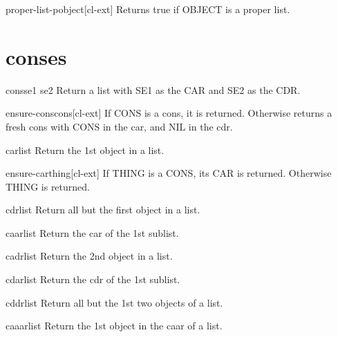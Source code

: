\documentclass[10pt,english]{book}
\begin{document}
\begin{function}{proper-list-p}{object}[cl-ext]
  Returns true if OBJECT is a proper list.
\end{function}

\section{conses}
\label{sec:conses}

\begin{function}{cons}{se1 se2}
  Return a list with SE1 as the CAR and SE2 as the CDR.
\end{function}

\begin{function}{ensure-cons}{cons}[cl-ext]
  If CONS is a cons, it is returned. Otherwise returns a fresh cons with CONS
  in the car, and NIL in the cdr.
\end{function}

\begin{accessor}{car}{list}
  Return the 1st object in a list.
\end{accessor}

\begin{function}{ensure-car}{thing}[cl-ext]
  If THING is a CONS, its CAR is returned. Otherwise THING is returned.
\end{function}

\begin{accessor}{cdr}{list}
  Return all but the first object in a list.
\end{accessor}

\begin{accessor}{caar}{list}
  Return the car of the 1st sublist.
\end{accessor}

\begin{accessor}{cadr}{list}
  Return the 2nd object in a list.
\end{accessor}

\begin{accessor}{cdar}{list}
  Return the cdr of the 1st sublist.
\end{accessor}

\begin{accessor}{cddr}{list}
  Return all but the 1st two objects of a list.
\end{accessor}

\begin{accessor}{caaar}{list}
  Return the 1st object in the caar of a list.
\end{accessor}
\end{document}
